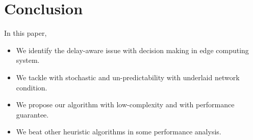 \section{Conclusion}
In this paper, 

\begin{itemize}
    \item We identify the delay-aware issue with decision making in edge computing system.
    \item We tackle with stochastic and un-predictability with underlaid network condition.
    \item We propose our algorithm with low-complexity and with performance guarantee.
    \item We beat other heuristic algorithms in some performance analysis.
\end{itemize}